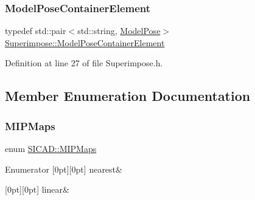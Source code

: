 \subsubsection{\texorpdfstring{Model\+Pose\+Container\+Element}{ModelPoseContainerElement}}
{\footnotesize\ttfamily typedef std\+::pair$<$std\+::string, \mbox{\hyperlink{classSuperimpose_a85d40a5caf19f486d1e0c15c0a025378}{Model\+Pose}}$>$ \mbox{\hyperlink{classSuperimpose_a1e02e0225687b42296dcfee4eadf8a55}{Superimpose\+::\+Model\+Pose\+Container\+Element}}\hspace{0.3cm}{\ttfamily [inherited]}}



Definition at line 27 of file Superimpose.\+h.



\subsection{Member Enumeration Documentation}
\mbox{\label{classSICAD_a7e092dede6f660355462d6d548214198}} 
\subsubsection{\texorpdfstring{M\+I\+P\+Maps}{MIPMaps}}
{\footnotesize\ttfamily enum \mbox{\hyperlink{classSICAD_a7e092dede6f660355462d6d548214198}{S\+I\+C\+A\+D\+::\+M\+I\+P\+Maps}}\hspace{0.3cm}{\ttfamily [strong]}}

\begin{DoxyEnumFields}{Enumerator}
[0pt][0pt]{}\mbox{\label{classSICAD_a7e092dede6f660355462d6d548214198ad879c351426770bc0b13c3628db1e636}} 
nearest&\\
\hline

[0pt][0pt]{}\mbox{\label{classSICAD_a7e092dede6f660355462d6d548214198a9a932b3cb396238423eb2f33ec17d6aa}} 
linear&\\
\hline

\end{DoxyEnumFields}


